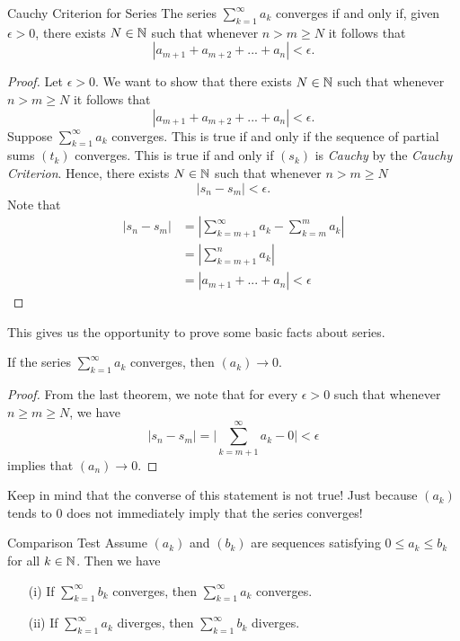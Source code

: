 \begin{theorem}{Cauchy Criterion for Series}{}
     The series \( \sum_{k=1}^{ \infty} a_k \) converges if and only if, given \( \epsilon > 0\), there exists \( N \in \mathbb{N} \) such that whenever \( n > m \geq N \) it follows that 
     \[ |a_{m+1} + a_{m+2} + ... + a_n| < \epsilon.\]
    \end{theorem}

\begin{proof}
    Let \(\epsilon > 0 \). We want to show that there exists \( N \in \mathbb{N} \) such that whenever \( n > m \geq N \) it follows that 
    \[|a_{m+1} + a_{m+2} + ... + a_n| < \epsilon.\]
    Suppose \( \sum_{k=1}^{\infty} a_k \) converges. This is true if and only if the sequence of partial sums \( (t_k)\) converges. This is true if and only if \( (s_k)\) is \textit{Cauchy} by the \textit{Cauchy Criterion}. Hence, there exists \( N \in \mathbb{N} \) such that whenever \( n > m \geq N \) 
    \[ |s_n - s_m | < \epsilon.\]
Note that 
\begin{align*}
    |s_n - s_m|&= | \sum_{k=m+1}^{\infty} a_k - \sum_{k=m}^{m} a_k|  \\
               &= |\sum_{k=m+1}^{n}a_k|\\
               &= |a_{m+1} + ... + a_n| < \epsilon
\end{align*}
\end{proof}

This gives us the opportunity to prove some basic facts about series.

\begin{theorem}{}{}
If the series \( \sum_{k=1}^{\infty} a_k \) converges, then \( (a_k) \to 0\).
\end{theorem}

\begin{proof}
From the last theorem, we note that for every \( \epsilon > 0 \) such that whenever \(n  \geq m \geq N \), we have  
\[ | s_n - s_m| = \Big| \sum_{k=m+1}^{ \infty} a_k - 0 \Big| < \epsilon\]
implies that \( (a_n) \to 0 \).
\end{proof}

Keep in mind that the converse of this statement is not true! Just because \( (a_k)\) tends to \( 0 \) does not immediately imply that the series converges! 

\begin{theorem}{Comparison Test}{}
Assume \((a_k)\) and \((b_k)\) are sequences satisfying \( 0 \leq a_k \leq b_k \) for all \( k \in \mathbb{N} \). Then we have 

\begin{enumerate}
    \item[(i)] If \( \sum_{k=1}^{\infty}b_k\) converges, then \( \sum_{k=1}^{\infty} a_k\) converges.
    \item[(ii)] If \( \sum_{k=1}^{\infty} a_k\) diverges, then \( \sum_{k=1}^{\infty} b_k\) diverges.
\end{enumerate}
\end{theorem}

